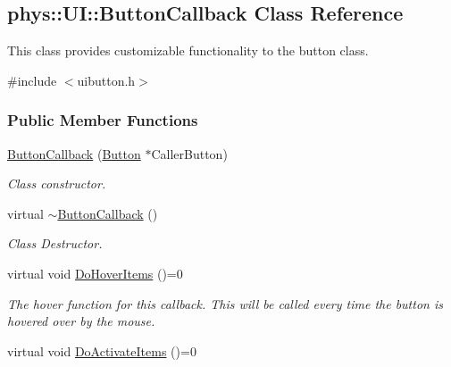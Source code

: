 \hypertarget{classphys_1_1UI_1_1ButtonCallback}{
\subsection{phys::UI::ButtonCallback Class Reference}
\label{classphys_1_1UI_1_1ButtonCallback}
}


This class provides customizable functionality to the button class.  




{\ttfamily \#include $<$uibutton.h$>$}

\subsubsection*{Public Member Functions}
\begin{DoxyCompactItemize}
\item 
\hyperlink{classphys_1_1UI_1_1ButtonCallback_a085db8789d4c712806e22c9040c69f39}{ButtonCallback} (\hyperlink{classphys_1_1UI_1_1Button}{Button} $\ast$CallerButton)
\begin{DoxyCompactList}\small\item\em Class constructor. \item\end{DoxyCompactList}\item 
\hypertarget{classphys_1_1UI_1_1ButtonCallback_a340fbc3fb86e9183285613f8af5b542e}{
virtual \hyperlink{classphys_1_1UI_1_1ButtonCallback_a340fbc3fb86e9183285613f8af5b542e}{$\sim$ButtonCallback} ()}
\label{classphys_1_1UI_1_1ButtonCallback_a340fbc3fb86e9183285613f8af5b542e}

\begin{DoxyCompactList}\small\item\em Class Destructor. \item\end{DoxyCompactList}\item 
\hypertarget{classphys_1_1UI_1_1ButtonCallback_a0374a47ec705a821ebf51162a7da9a54}{
virtual void \hyperlink{classphys_1_1UI_1_1ButtonCallback_a0374a47ec705a821ebf51162a7da9a54}{DoHoverItems} ()=0}
\label{classphys_1_1UI_1_1ButtonCallback_a0374a47ec705a821ebf51162a7da9a54}

\begin{DoxyCompactList}\small\item\em The hover function for this callback. This will be called every time the button is hovered over by the mouse. \item\end{DoxyCompactList}\item 
\hypertarget{classphys_1_1UI_1_1ButtonCallback_a47d5ff1399ac9f4ff586ea5e0c63249f}{
virtual void \hyperlink{classphys_1_1UI_1_1ButtonCallback_a47d5ff1399ac9f4ff586ea5e0c63249f}{DoActivateItems} ()=0}
\label{classphys_1_1UI_1_1ButtonCallback_a47d5ff1399ac9f4ff586ea5e0c63249f}


\end{DoxyCompactItemize}
